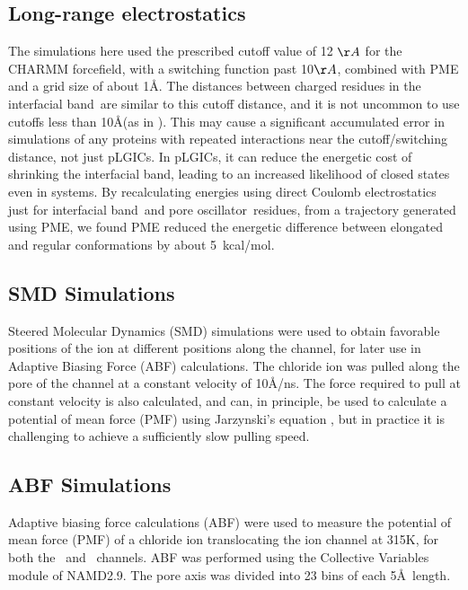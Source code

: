 \documentclass[9pt,onecolumn,oneside,lineno]{pnas-new}
\newcommand{\fivering}{interfacial band~}
\newcommand{\fiveringnos}{interfacial band}
\newcommand{\triad}{pore oscillator~}
\begin{document}
\subsection*{Long-range electrostatics}

The simulations here used the prescribed cutoff value of 12 $\AA$ for the CHARMM forcefield, with a switching function past 10$\AA$, combined with PME and a grid size of about 1\AA.   The distances between charged residues in the \fivering are similar to this cutoff distance, and it is not uncommon to use cutoffs less than 10\AA (as in \cite{Lev2017}).  This may cause a significant accumulated error in simulations of any proteins with repeated interactions near the cutoff/switching distance, not just pLGICs. In pLGICs, it can reduce the energetic cost of shrinking the \fiveringnos, leading to an increased likelihood of closed states even in \WT systems. By recalculating energies using direct Coulomb electrostatics just for \fivering and \triad residues, from a trajectory generated using PME, we found PME reduced the energetic difference between elongated and regular conformations by about 5~kcal/mol. 

\subsection*{SMD Simulations} Steered Molecular Dynamics (SMD) simulations \cite{Isralewitz2001,Park2004}
were used to obtain favorable positions of the ion at different positions along the channel, for later use in Adaptive Biasing Force (ABF) calculations. The chloride ion was pulled along the pore of the channel  at a constant velocity of 10\AA\//ns. The force required to pull at constant velocity is also calculated, and can, in principle, be used to calculate a potential of mean force (PMF) using Jarzynski's equation \cite{Jarzynski1997,Jarzynski1997a}, but in practice it is challenging to achieve a sufficiently slow pulling speed. 

\subsection*{ABF Simulations} Adaptive biasing force calculations (ABF)\cite{Henin2004,Darve2008,Pohorille2010,Comer2014}  were used to measure the potential of mean force (PMF)  of a chloride ion translocating the \GABAA ion channel at 315K, for both the \WT\ and \MT\ channels. ABF was performed using the Collective Variables module\cite{Fiorin2013} of NAMD2.9.  The pore axis was divided into 23 bins of each 5\AA\ length.
\end{document}
